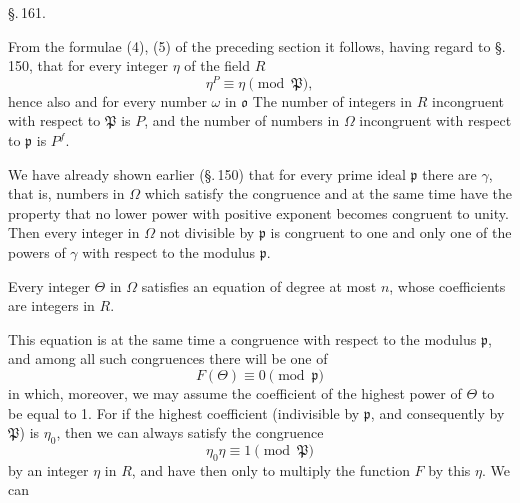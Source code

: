 \begin{center}
\S.\,161.\\[4pt]
\end{center}

From the formulae (4), (5) of the preceding section it follows, having regard to \S.\,150, that for every integer $\eta$ of the field $R$
\[
\eta^P \equiv \eta \pmod{\mathfrak{P}},
\]
hence also
and for every number $\omega$ in $\mathfrak{o}$
The number of integers in $R$ incongruent with respect to $\mathfrak{P}$ is $P$, and the number of numbers in $\Omega$ incongruent with respect to $\mathfrak{p}$ is $P^f$.

We have already shown earlier (\S.\,150) that for every prime ideal $\mathfrak{p}$ there are  $\gamma$, that is, numbers in $\Omega$ which satisfy the congruence
and at the same time have the property that no lower power with positive exponent becomes congruent to unity. Then every integer in $\Omega$ not divisible by $\mathfrak{p}$ is congruent to one and only one of the powers of $\gamma$
with respect to the modulus $\mathfrak{p}$.

Every integer $\Theta$ in $\Omega$ satisfies an equation of degree at most $n$, whose coefficients are integers in $R$.

This equation is at the same time a congruence with respect to the modulus $\mathfrak{p}$, and among all such congruences there will be one of 
\[
F(\Theta) \equiv 0 \pmod{\mathfrak{p}}
\]
in which, moreover, we may assume the coefficient of the highest power of $\Theta$ to be equal to 1. For if the highest coefficient (indivisible by $\mathfrak{p}$, and consequently by $\mathfrak{P}$) is $\eta_0$, then we can always satisfy the congruence
\[
\eta_0 \eta \equiv 1 \pmod{\mathfrak{P}}
\]
by an integer $\eta$ in $R$, and have then only to multiply the function $F$ by this $\eta$. We can
